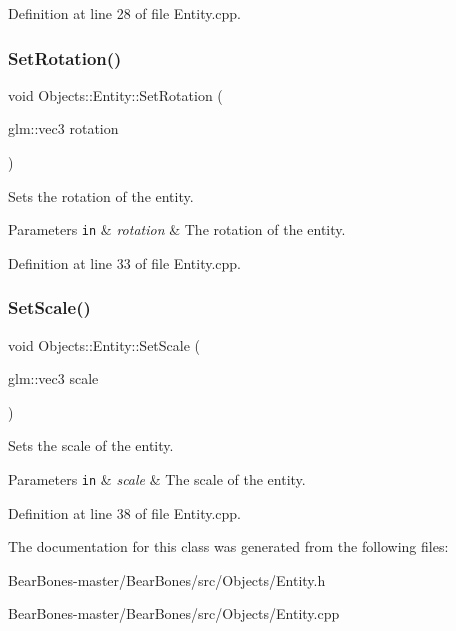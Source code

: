 Definition at line 28 of file Entity.\+cpp.

\mbox{\label{class_objects_1_1_entity_a26e73e8b7f3ed5b3583b14ccba2fd459}} 
\subsubsection{\texorpdfstring{Set\+Rotation()}{SetRotation()}}
{\footnotesize\ttfamily void Objects\+::\+Entity\+::\+Set\+Rotation (\begin{DoxyParamCaption}\item[{glm\+::vec3}]{rotation }\end{DoxyParamCaption})}

Sets the rotation of the entity. 
\begin{DoxyParams}[1]{Parameters}
\mbox{\tt in}  & {\em rotation} & The rotation of the entity. \\
\hline
\end{DoxyParams}


Definition at line 33 of file Entity.\+cpp.

\mbox{\label{class_objects_1_1_entity_af1cd8b1f5688d01647df4e5ea1d415ae}} 
\subsubsection{\texorpdfstring{Set\+Scale()}{SetScale()}}
{\footnotesize\ttfamily void Objects\+::\+Entity\+::\+Set\+Scale (\begin{DoxyParamCaption}\item[{glm\+::vec3}]{scale }\end{DoxyParamCaption})}

Sets the scale of the entity. 
\begin{DoxyParams}[1]{Parameters}
\mbox{\tt in}  & {\em scale} & The scale of the entity. \\
\hline
\end{DoxyParams}


Definition at line 38 of file Entity.\+cpp.



The documentation for this class was generated from the following files\+:\begin{DoxyCompactItemize}
\item 
Bear\+Bones-\/master/\+Bear\+Bones/src/\+Objects/Entity.\+h\item 
Bear\+Bones-\/master/\+Bear\+Bones/src/\+Objects/Entity.\+cpp\end{DoxyCompactItemize}
